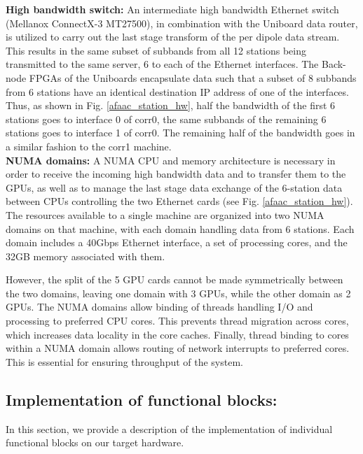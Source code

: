 \documentclass{ws-jai}
\begin{document}
\noindent  \textbf  {High  bandwidth  switch:} An  intermediate  high  bandwidth
Ethernet switch (Mellanox ConnectX-3 MT27500),  in combination with the Uniboard
data router, is utilized to carry out the last stage transform of the per dipole
data stream. This  results in the same  subset of subbands from  all 12 stations
being transmitted to the same server, 6 to each of the Ethernet interfaces.  The
Back-node  FPGAs of  the Uniboards  encapsulate  data such  that a  subset of  8
subbands from 6 stations have an identical  destination IP address of one of the
interfaces. Thus, as shown in Fig. \ref{afaac_station_hw}, half the bandwidth of
the first  6 stations goes  to interface  0 of corr0,  the same subbands  of the
remaining 6  stations goes to  interface 1 of corr0.  The remaining half  of the
bandwidth goes in a similar fashion to the corr1 machine.\\

\noindent  \textbf  {NUMA  domains:}  A  NUMA CPU  and  memory  architecture  is
necessary in order  to receive the incoming high bandwidth  data and to transfer
them to  the GPUs,  as well as  to manage  the last stage  data exchange  of the
6-station  data   between  CPUs   controlling  the   two  Ethernet   cards  (see
Fig. \ref{afaac_station_hw}).  The  resources available to a  single machine are
organized into two NUMA domains on  that machine, with each domain handling data
from 6  stations. Each  domain includes  a 40Gbps Ethernet  interface, a  set of
processing cores, and the 32GB  memory associated with them.

However, the split of  the 5 GPU cards cannot be  made symmetrically between the
two domains, leaving one  domain with 3 GPUs, while the other  domain as 2 GPUs.
The  NUMA domains  allow  binding  of threads  handling  I/O  and processing  to
preferred  CPU  cores.   This  prevents thread  migration  across  cores,  which
increases data  locality in the core  caches.  Finally, thread binding  to cores
within a  NUMA domain allows routing  of network interrupts to  preferred cores.
This is essential for ensuring throughput of the system.

\subsection {Implementation of functional  blocks:} 

In this  section, we provide a  description of the implementation  of individual
functional blocks on our target hardware.\\
\end{document}
